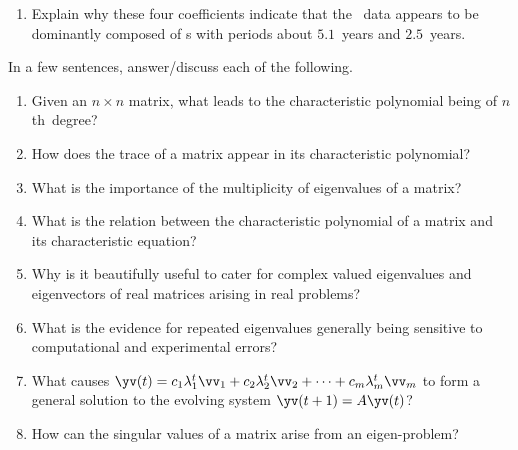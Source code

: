 \begin{reduce}
\begin{exercise}
\begin{enumerate}
\item Explain why these four coefficients indicate that the \soi\ data appears to be dominantly composed of s with periods about \(5.1\)~years and \(2.5\)~years.

\end{enumerate}
\end{exercise}

\end{reduce}










\begin{exercise} 
In a few sentences, answer\slash discuss each of the following.
\begin{enumerate}
\item  Given an \(n\times n\) matrix, what leads to the characteristic polynomial being of \(n\)th~degree?

\item How does the trace of a matrix appear in its characteristic polynomial?

\item What is the importance of the multiplicity of eigenvalues of a matrix?

\item What is the relation between the characteristic polynomial of a matrix and its characteristic equation?

\item Why is it beautifully useful to cater for complex valued eigenvalues and eigenvectors of real matrices arising in real problems?

\item What is the evidence for repeated eigenvalues generally being sensitive to computational and experimental errors?

\item What causes \(\yv(t)=c_1\lambda_1^t\vv_1+c_2\lambda_2^t\vv_2+\cdots+c_m\lambda_m^t\vv_m\) to form a general solution to the evolving system \(\yv(t+1)=A\yv(t)\)?

\item How can the singular values of a matrix arise from an eigen-problem?


\end{enumerate}
\end{exercise}

